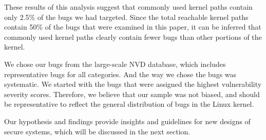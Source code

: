These results of this analysis suggest that commonly used kernel paths contain only
2.5\% of the bugs we had targeted. 
Since the total reachable kernel paths contain 50\% of the bugs that were 
examined in this paper, 
it can be inferred that commonly used kernel paths clearly contain fewer bugs
than other portions of the kernel. 

We chose our bugs from the large-scale NVD database, which includes representative 
bugs for all categories. And the way we chose the bugs was systematic. We 
started with the bugs that were assigned the highest vulnerability severity scores. 
Therefore, we believe that our sample was not biased, and should be representative 
to reflect the general distribution of bugs in the Linux kernel.  

Our hypothesis and findings provide insights and guidelines for new designs
of secure systems, 
which will be discussed in the next section. 
